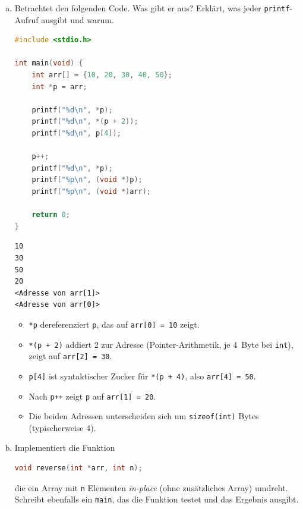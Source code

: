 
\begin{enumerate}[a)]

\item Betrachtet den folgenden Code. Was gibt er aus? Erklärt, was jeder
\texttt{printf}-Aufruf ausgibt und warum.

\begin{lstlisting}[language=C]
#include <stdio.h>

int main(void) {
    int arr[] = {10, 20, 30, 40, 50};
    int *p = arr;

    printf("%d\n", *p);
    printf("%d\n", *(p + 2));
    printf("%d\n", p[4]);

    p++;
    printf("%d\n", *p);
    printf("%p\n", (void *)p);
    printf("%p\n", (void *)arr);

    return 0;
}
\end{lstlisting}

\begin{loesung}
\begin{lstlisting}[language={}]
10
30
50
20
<Adresse von arr[1]>
<Adresse von arr[0]>
\end{lstlisting}

\begin{itemize}
  \item \texttt{*p} dereferenziert \texttt{p}, das auf \texttt{arr[0] = 10} zeigt.
  \item \texttt{*(p + 2)} addiert 2 zur Adresse (Pointer-Arithmetik, je 4~Byte bei \texttt{int}), zeigt auf \texttt{arr[2] = 30}.
  \item \texttt{p[4]} ist syntaktischer Zucker für \texttt{*(p + 4)}, also \texttt{arr[4] = 50}.
  \item Nach \texttt{p++} zeigt \texttt{p} auf \texttt{arr[1] = 20}.
  \item Die beiden Adressen unterscheiden sich um \texttt{sizeof(int)} Bytes (typischerweise 4).
\end{itemize}
\end{loesung}

\item Implementiert die Funktion

\begin{lstlisting}[language=C]
void reverse(int *arr, int n);
\end{lstlisting}

die ein Array mit \texttt{n} Elementen \emph{in-place} (ohne zusätzliches Array) umdreht.
Schreibt ebenfalls ein \texttt{main}, das die Funktion testet und das Ergebnis ausgibt.


\end{enumerate}
